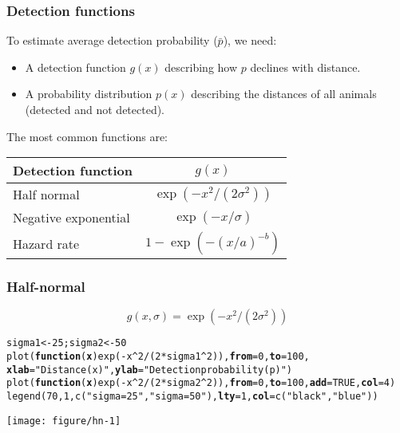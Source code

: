 \documentclass[color=usenames,dvipsnames]{beamer}\usepackage[]{graphicx}\usepackage[]{color}
\makeatletter
\newcommand{\hlnum}[1]{\textcolor[rgb]{0.69,0.494,0}{#1}}%
\newcommand{\hlstr}[1]{\textcolor[rgb]{0.749,0.012,0.012}{#1}}%
\newcommand{\hlopt}[1]{\textcolor[rgb]{0,0,0}{#1}}%
\newcommand{\hlstd}[1]{\textcolor[rgb]{0,0,0}{#1}}%
\newcommand{\hlkwa}[1]{\textcolor[rgb]{0,0,0}{\textbf{#1}}}%
\newcommand{\hlkwb}[1]{\textcolor[rgb]{0,0.341,0.682}{#1}}%
\newcommand{\hlkwc}[1]{\textcolor[rgb]{0,0,0}{\textbf{#1}}}%
\newcommand{\hlkwd}[1]{\textcolor[rgb]{0.004,0.004,0.506}{#1}}%
\newenvironment{kframe}{%
 \def\at@end@of@kframe{}%
 \ifinner\ifhmode%
  \def\at@end@of@kframe{\end{minipage}}%
  \begin{minipage}{\columnwidth}%
 \fi\fi%
 \def\FrameCommand##1{\hskip\@totalleftmargin \hskip-\fboxsep
 \colorbox{shadecolor}{##1}\hskip-\fboxsep
     \hskip-\linewidth \hskip-\@totalleftmargin \hskip\columnwidth}%
 \MakeFramed {\advance\hsize-\width
   \@totalleftmargin\z@ \linewidth\hsize
   \@setminipage}}%
 {\par\unskip\endMakeFramed%
 \at@end@of@kframe}
\newenvironment{knitrout}{}{} %
\makeatother
\begin{document}
\begin{frame}
  \frametitle{Detection functions}
  To estimate average detection probability ($\bar{p}$), we need:
  \begin{itemize}
    \item A detection function $g(x)$ describing how $p$ declines with
      distance.
    \item A probability distribution $p(x)$ describing the
      distances of all animals (detected and not detected). 
  \end{itemize}
  \pause
  \vfill
  \centering
  The most common functions are: \\
  \vspace{6pt}
  \begin{tabular}{lc}
    \hline
    Detection function & $g(x)$ \\
    \hline
    Half normal & $\exp(-x^2 / (2\sigma^2))$ \\
    Negative exponential & $\exp(-x/\sigma)$ \\
    Hazard rate & $1-\exp(-(x/a)^{-b})$ \\
    \hline
  \end{tabular}
\end{frame}


\begin{frame}[fragile]
  \frametitle{Half-normal}
  \footnotesize
  \[
    g(x,\sigma) = \exp(-x^2/(2\sigma^2))
  \]
  \vspace{-12pt}
  \centering
\begin{knitrout}\scriptsize
{}\color{fgcolor}\begin{kframe}
\begin{alltt}
\hlstd{sigma1} \hlkwb{<-} \hlnum{25}\hlstd{; sigma2} \hlkwb{<-} \hlnum{50}
\hlkwd{plot}\hlstd{(}\hlkwa{function}\hlstd{(}\hlkwc{x}\hlstd{)} \hlkwd{exp}\hlstd{(}\hlopt{-}\hlstd{x}\hlopt{^}\hlnum{2}\hlopt{/}\hlstd{(}\hlnum{2}\hlopt{*}\hlstd{sigma1}\hlopt{^}\hlnum{2}\hlstd{)),} \hlkwc{from}\hlstd{=}\hlnum{0}\hlstd{,} \hlkwc{to}\hlstd{=}\hlnum{100}\hlstd{,}
     \hlkwc{xlab}\hlstd{=}\hlstr{"Distance (x)"}\hlstd{,} \hlkwc{ylab}\hlstd{=}\hlstr{"Detection probability (p)"}\hlstd{)}
\hlkwd{plot}\hlstd{(}\hlkwa{function}\hlstd{(}\hlkwc{x}\hlstd{)} \hlkwd{exp}\hlstd{(}\hlopt{-}\hlstd{x}\hlopt{^}\hlnum{2}\hlopt{/}\hlstd{(}\hlnum{2}\hlopt{*}\hlstd{sigma2}\hlopt{^}\hlnum{2}\hlstd{)),} \hlkwc{from}\hlstd{=}\hlnum{0}\hlstd{,} \hlkwc{to}\hlstd{=}\hlnum{100}\hlstd{,} \hlkwc{add}\hlstd{=}\hlnum{TRUE}\hlstd{,} \hlkwc{col}\hlstd{=}\hlnum{4}\hlstd{)}
\hlkwd{legend}\hlstd{(}\hlnum{70}\hlstd{,} \hlnum{1}\hlstd{,} \hlkwd{c}\hlstd{(}\hlstr{"sigma=25"}\hlstd{,} \hlstr{"sigma=50"}\hlstd{),} \hlkwc{lty}\hlstd{=}\hlnum{1}\hlstd{,} \hlkwc{col}\hlstd{=}\hlkwd{c}\hlstd{(}\hlstr{"black"}\hlstd{,}\hlstr{"blue"}\hlstd{))}
\end{alltt}
\end{kframe}
\texttt{[image: figure/hn-1]} 

\end{knitrout}
\end{frame}
\end{document}
